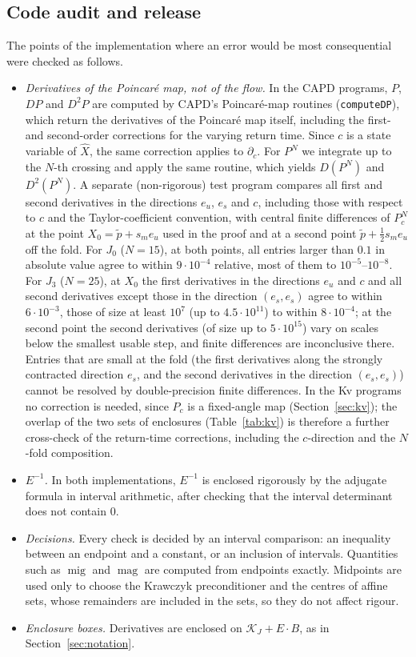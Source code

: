 \documentclass[11pt]{amsart}
\theoremstyle{definition}
\theoremstyle{remark}
\newcommand{\magn}{\operatorname{mag}}
\newcommand{\mig}{\operatorname{mig}}
\newcommand{\eu}{e_u}
\newcommand{\es}{e_s}
\newcommand{\Kr}{\mathcal{K}}
\begin{document}
\subsection{Code audit and release}\label{sec:audit}
The points of the implementation where an error would be most consequential were checked as follows.
\begin{itemize}[leftmargin=*]
\item \emph{Derivatives of the Poincar\'e map, not of the flow.} In the CAPD programs, $P$, $DP$ and $D^2P$ are
computed by CAPD's Poincar\'e-map routines (\texttt{computeDP}), which return the derivatives of the
Poincar\'e map itself, including the first- and second-order corrections for the varying return time. Since
$c$ is a state variable of $\hat X$, the same correction applies to $\partial_c$. For $P^N$ we integrate up to
the $N$-th crossing and apply the same routine, which yields $D(P^N)$ and $D^2(P^N)$. A separate
(non-rigorous) test program compares all first and second derivatives in the directions $\eu$, $\es$ and $c$,
including those with respect to $c$ and the Taylor-coefficient convention, with central finite differences of
$P^N_c$ at the point $X_0=\tilde p+s_m\eu$ used in the proof and at a second point $\tilde p+\frac12s_m\eu$ off the
fold. For $J_0$ ($N=15$), at both points, all entries larger than $0.1$ in absolute value agree to within
$9\cdot10^{-4}$ relative, most of them to $10^{-5}$--$10^{-8}$. For $J_3$ ($N=25$), at $X_0$ the first derivatives in
the directions $\eu$ and $c$ and all second derivatives except those in the direction $(\es,\es)$ agree to within
$6\cdot10^{-3}$, those of size at least $10^7$ (up to $4.5\cdot10^{11}$) to within $8\cdot10^{-4}$; at the second point the
second derivatives (of size up to $5\cdot10^{15}$) vary on scales below the smallest usable step, and finite
differences are inconclusive there. Entries that are small at the fold (the first derivatives along the
strongly contracted direction $\es$, and the second derivatives in the direction $(\es,\es)$) cannot be resolved
by double-precision finite differences. In the Kv programs no
correction is needed, since $P_c$ is a fixed-angle map (Section~\ref{sec:kv}); the overlap of the two sets of
enclosures (Table~\ref{tab:kv}) is therefore a further cross-check of the return-time corrections, including
the $c$-direction and the $N$-fold composition.
\item \emph{$E^{-1}$.} In both implementations, $E^{-1}$ is enclosed rigorously by the adjugate formula in
interval arithmetic, after checking that the interval determinant does not contain $0$.
\item \emph{Decisions.} Every check is decided by an interval comparison: an inequality between an endpoint and
a constant, or an inclusion of intervals. Quantities such as $\mig$ and $\magn$ are computed from endpoints
exactly. Midpoints are used only to choose the Krawczyk preconditioner and the centres of affine sets, whose
remainders are included in the sets, so they do not affect rigour.
\item \emph{Enclosure boxes.} Derivatives are enclosed on $\Kr_J+E\cdot B$, as in Section~\ref{sec:notation}.
\end{itemize}
\end{document}
